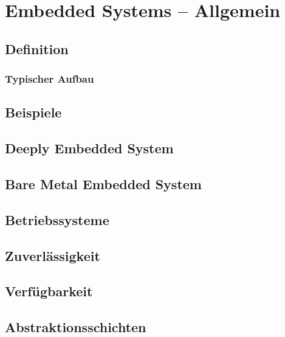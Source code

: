 \section{Embedded Systems -- Allgemein}
\subsection{Definition}
\subsubsection{Typischer Aufbau} %


\subsection{Beispiele}


\subsection{Deeply Embedded System}


\subsection{Bare Metal Embedded System}


\subsection{Betriebssysteme}


\subsection{Zuverlässigkeit}


\subsection{Verfügbarkeit}


\subsection{Abstraktionsschichten}


